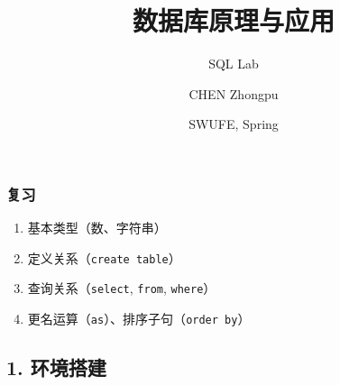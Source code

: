 \documentclass[aspectratio=169, 14pt]{beamer}
\title[Database Principles and Applications] %
{数据库原理与应用}
\subtitle{SQL Lab}
\author[CHEN Zhongpu] %
{CHEN Zhongpu}
\institute[] %
{
  School of Computing and Artificial Intelligence \\
  \href{mailto:zpchen@swufe.edu.cn}{zpchen@swufe.edu.cn}
}
\date[] %
{SWUFE, Spring \the\year{}}
\begin{document}
\frame{\titlepage}

\begin{frame}
	\frametitle{复习}
	\begin{enumerate}
		\item 基本类型（数、字符串）
		\item 定义关系（\texttt{create table}）
		\item 查询关系（\texttt{select}, \texttt{from}, \texttt{where}）
		\item 更名运算（\texttt{as}）、排序子句（\texttt{order by}）
	\end{enumerate}
\end{frame}

{
\begin{frame}
	\section{\textcolor{darkmidnightblue}{1. 环境搭建}}
\end{frame}
}
\end{document}
